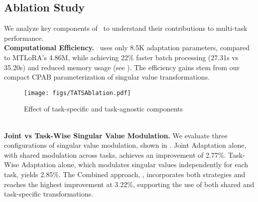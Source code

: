 \subsection{Ablation Study}
\label{sec:ablation}
We analyze key components of \ourmethod\ to understand their contributions to multi-task performance.
\\
\noindent\textbf{Computational Efficiency.}
\ourmethod\ uses only 8.5K adaptation parameters, compared to MTLoRA's 4.86M, while achieving 22\% faster batch processing (27.31s vs 35.20s) and reduced memory usage (see ). The efficiency gains stem from our compact CPAB parameterization of singular value transformations.
\begin{figure}[t]
  \centering
\texttt{[image: figs/TATSAblation.pdf]} 
  \caption{Effect of task-specific and task-agnostic components}
  \label{fig:ab1}
\end{figure}
\\
\noindent\textbf{Joint vs Task-Wise Singular Value Modulation.}
We evaluate three configurations of singular value modulation, shown in  . Joint Adaptation alone, with shared modulation across tasks, achieves an improvement of 2.77\%. Task-Wise Adaptation alone, which modulates singular values independently for each task, yields 2.85\%. The Combined approach, \ourmethod, incorporates both strategies and reaches the highest improvement at 3.22\%, supporting the use of both shared and task-specific transformations.

